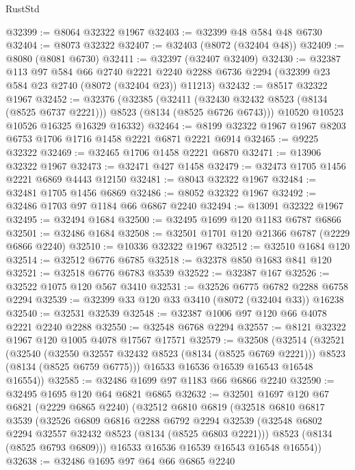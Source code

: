 \begin{lexlean}{RustStd}
\begin{coremodule}
{\begin{coremodule}
{{{{{{{{{{{{{{{{{{{{{{{{{{{{{{{{{{{{{{{{{{{{{{{{{{{{{@32399 := @8064 @32322 @1967
@32403 := @32399 @48 @584 @48 @6730
@32404 := @8073 @32322
@32407 := @32403 (@8072 (@32404 @48))
@32409 := @8080 (@8081 @6730)
@32411 := @32397 (@32407 @32409)
@32430 := @32387
    @113
    @97
    @584
    @66
    @2740
    @2221
    @2240
    @2288
    @6736
    @2294
    (@32399 @23 @584 @23 @2740 (@8072 (@32404 @23)) @11213)
@32432 := @8517 @32322 @1967
@32452 := @32376
    (@32385
      (@32411 (@32430 @32432 @8523 (@8134 (@8525 @6737 @2221))) @8523 (@8134 (@8525 @6726 @6743)))
      @10520
      @10523
      @10526
      @16325
      @16329
      @16332)
@32464 := @8199 @32322 @1967 @1967 @8203 @6753 @1706 @1716 @1458 @2221 @6871 @2221 @6914
@32465 := @9225 @32322
@32469 := @32465 @1706 @1458 @2221 @6870
@32471 := @13906 @32322 @1967
@32473 := @32471 @427 @1458
@32479 := @32473 @1705 @1456 @2221 @6869 @4443 @12150
@32481 := @8043 @32322 @1967
@32484 := @32481 @1705 @1456 @6869
@32486 := @8052 @32322 @1967
@32492 := @32486 @1703 @97 @1184 @66 @6867 @2240
@32494 := @13091 @32322 @1967
@32495 := @32494 @1684
@32500 := @32495 @1699 @120 @1183 @6787 @6866
@32501 := @32486 @1684
@32508 := @32501 @1701 @120 @21366 @6787 (@2229 @6866 @2240)
@32510 := @10336 @32322 @1967
@32512 := @32510 @1684 @120
@32514 := @32512 @6776 @6785
@32518 := @32378 @850 @1683 @841 @120
@32521 := @32518 @6776 @6783 @3539
@32522 := @32387 @167
@32526 := @32522 @1075 @120 @567 @3410
@32531 := @32526 @6775 @6782 @2288 @6758 @2294
@32539 := @32399 @33 @120 @33 @3410 (@8072 (@32404 @33)) @16238
@32540 := @32531 @32539
@32548 := @32387 @1006 @97 @120 @66 @4078 @2221 @2240 @2288
@32550 := @32548 @6768 @2294
@32557 := @8121 @32322 @1967 @120 @1005 @4078 @17567 @17571
@32579 := @32508
    (@32514
      (@32521
        (@32540
          (@32550 @32557 @32432 @8523 (@8134 (@8525 @6769 @2221)))
          @8523
          (@8134 (@8525 @6759 @6775)))
        @16533
        @16536
        @16539
        @16543
        @16548
        @16554))
@32585 := @32486 @1699 @97 @1183 @66 @6866 @2240
@32590 := @32495 @1695 @120 @64 @6821 @6865
@32632 := @32501
    @1697
    @120
    @67
    @6821
    (@2229 @6865 @2240)
    (@32512
      @6810
      @6819
      (@32518
        @6810
        @6817
        @3539
        (@32526
          @6809
          @6816
          @2288
          @6792
          @2294
          @32539
          (@32548 @6802 @2294 @32557 @32432 @8523 (@8134 (@8525 @6803 @2221)))
          @8523
          (@8134 (@8525 @6793 @6809)))
        @16533
        @16536
        @16539
        @16543
        @16548
        @16554))
@32638 := @32486 @1695 @97 @64 @66 @6865 @2240
}}}}}}}}}}}}}}}}}}}}}}}}}}}}}}}}}}}}}}}}}}}}}}}}}}}}}
\end{coremodule}}
\end{coremodule}
\end{lexlean}
